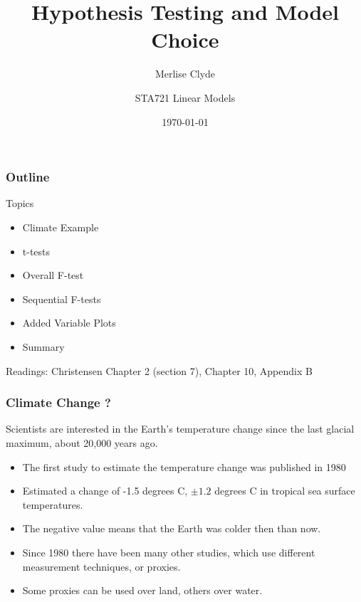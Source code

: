 \documentclass[handout]{beamer}
\title{Hypothesis Testing and Model Choice}
\subtitle{Merlise Clyde}
\author{STA721 Linear Models}
\institute{Duke University}
\date{\today}
\begin{document}
\maketitle

\begin{frame}\frametitle{Outline}
Topics
  \begin{itemize}
  \item Climate Example
  \item t-tests
  \item Overall F-test
  \item Sequential F-tests
  \item Added Variable Plots
  \item Summary

  \end{itemize}


Readings: Christensen Chapter 2 (section 7),  Chapter 10, Appendix B
\end{frame}

\begin{frame}
  \frametitle{Climate Change ?}
  Scientists are interested in the Earth's temperature change since the last 
glacial maximum, about 20,000 years ago. \pause
\begin{itemize}
\item  The first study to estimate the 
temperature change was published in 1980 
\item  Estimated a change of -1.5 
degrees C, $\pm 1.2$ degrees C in tropical sea surface temperatures.  
\item The 
negative value means that the Earth was colder then than now.  
\item Since 1980 
there have been many other studies, which use different 
measurement techniques, or proxies.  
\item Some proxies can be used over land, 
others over water. 
\end{itemize}
\end{frame}
\end{document}
